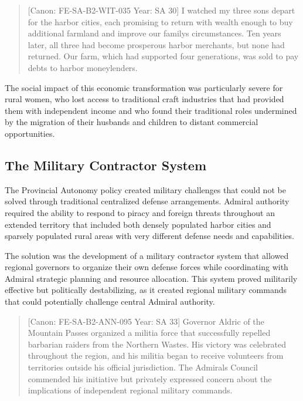 \begin{quote}
{[}Canon: FE-SA-B2-WIT-035 \textbar{} Year: SA 30{]} I watched my three
sons depart for the harbor cities, each promising to return with wealth
enough to buy additional farmland and improve our
family\textquotesingle s circumstances. Ten years later, all three had
become prosperous harbor merchants, but none had returned. Our farm,
which had supported four generations, was sold to pay debts to harbor
moneylenders.
\end{quote}

The social impact of this economic transformation was particularly
severe for rural women, who lost access to traditional craft industries
that had provided them with independent income and who found their
traditional roles undermined by the migration of their husbands and
children to distant commercial opportunities.

\subsection{The Military Contractor
System}\label{the-military-contractor-system}

The Provincial Autonomy policy created military challenges that could
not be solved through traditional centralized defense arrangements.
Admiral authority required the ability to respond to piracy and foreign
threats throughout an extended territory that included both densely
populated harbor cities and sparsely populated rural areas with very
different defense needs and capabilities.

The solution was the development of a military contractor system that
allowed regional governors to organize their own defense forces while
coordinating with Admiral strategic planning and resource allocation.
This system proved militarily effective but politically destabilizing,
as it created regional military commands that could potentially
challenge central Admiral authority.

\begin{quote}
{[}Canon: FE-SA-B2-ANN-095 \textbar{} Year: SA 33{]} Governor Aldric of
the Mountain Passes organized a militia force that successfully repelled
barbarian raiders from the Northern Wastes. His victory was celebrated
throughout the region, and his militia began to receive volunteers from
territories outside his official jurisdiction. The
Admiral\textquotesingle s Council commended his initiative but privately
expressed concern about the implications of independent regional
military commands.
\end{quote}


